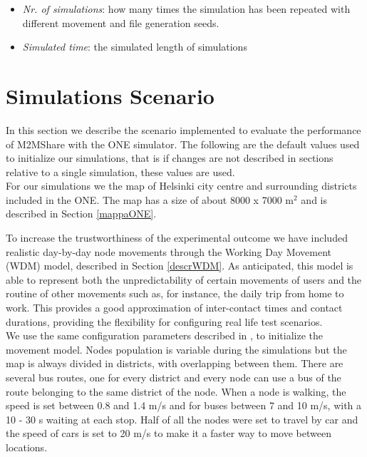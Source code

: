 \begin{itemize}
\item \textit{Nr. of simulations}: how many times the simulation has been repeated with different movement and file generation seeds.

\item \textit{Simulated time}: the simulated length of simulations

\end{itemize}


\section{Simulations Scenario}
In this section we describe the scenario implemented to evaluate the performance of M2MShare with the ONE simulator. The following are the default values used to initialize our simulations, that is if changes are not described in sections relative to a single simulation, these values are used.
\\

For our simulations we the map of Helsinki city centre and surrounding districts included in the ONE. The map has a size of about 8000 x 7000 m$^{2}$ and is described in Section \ref{mappaONE}. 


To increase the trustworthiness of the experimental outcome we have included realistic day-by-day node movements through the Working Day Movement (WDM) model, described in Section \ref{descrWDM}. As anticipated, this model is able to represent both the unpredictability of certain movements of users and the routine of other movements such as, for instance, the daily trip from home to work. This provides a good approximation of inter-contact times and contact durations, providing the flexibility for configuring real life test scenarios.
\\

We use the same configuration parameters described in \cite{articoloWdm}, to initialize the movement model. Nodes population is variable during the simulations but the map is always divided in districts, with overlapping between them. There are several bus routes, one for every district and every node can use a bus of the route belonging to the same district of the node. When a node is walking, the speed is set between 0.8 and 1.4 m/s and for buses between 7 and 10 m/s, with a 10 - 30 s waiting at each stop. Half of all the nodes were set to travel by car and the speed of cars is set to 20 m/s to make it a faster way to move between locations. 
\\

